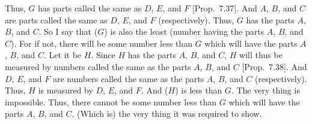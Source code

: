 \begin{Parallel}{}{}
{Thus, $G$ has parts called the same as $D$, $E$, and $F$ [Prop.~7.37]. And $A$, $B$, and $C$ are 
parts called the same as $D$, $E$, and $F$ (respectively). Thus, $G$ has the parts $A$, $B$, and $C$. So I say that ($G$) is also the least (number having the parts $A$, $B$, and $C$). For if not, there will be some number less than $G$ which will have the parts $A$, $B$, and $C$. Let it be
$H$. Since $H$ has the parts $A$, $B$, and $C$, $H$ will thus be measured
by numbers called the same as the parts $A$, $B$, and $C$  [Prop.~7.38]. And $D$, $E$, and $F$ are numbers called the same as the parts $A$, $B$, and $C$ (respectively). Thus, $H$ is measured by $D$, $E$, and $F$. And ($H$) is less than $G$. The
very thing is impossible. Thus, there cannot be some number less than $G$
which will have the parts $A$, $B$, and $C$. (Which is) the very thing it
was required to show.}
\end{Parallel}

\newpage
\thispagestyle{plain}
~\\
